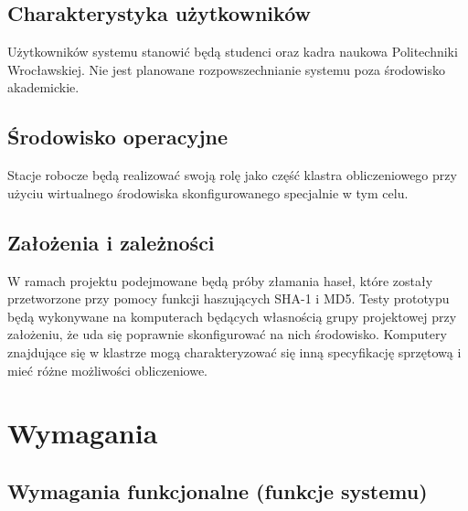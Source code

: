 \documentclass[a4paper,10pt]{article}
\begin{document}
\subsection{Charakterystyka użytkowników}
Użytkowników systemu stanowić będą studenci oraz kadra naukowa Politechniki Wrocławskiej. Nie jest planowane rozpowszechnianie systemu poza środowisko akademickie.
\subsection{Środowisko operacyjne}
Stacje robocze będą realizować swoją rolę jako część klastra obliczeniowego przy użyciu wirtualnego środowiska skonfigurowanego specjalnie w tym celu.
\subsection{Założenia i zależności}
W ramach projektu podejmowane będą próby złamania haseł, które zostały przetworzone przy pomocy funkcji haszujących SHA-1 i MD5. Testy prototypu będą wykonywane na komputerach będących własnością grupy projektowej przy założeniu, że uda się poprawnie skonfigurować na nich środowisko. Komputery znajdujące się w klastrze mogą charakteryzować się inną specyfikację sprzętową i mieć różne możliwości obliczeniowe.
\section{Wymagania}
\subsection{Wymagania funkcjonalne (funkcje systemu)}
\end{document}
